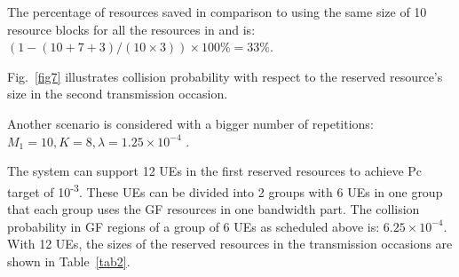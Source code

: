 \documentclass[conference]{IEEEtran}
\begin{document}

The percentage of resources saved in comparison to using the same size of 10 resource blocks for all the resources in \cite{b5} and \cite{b7} is: $(1 - (10+7+3)/(10\times3))\times100\% = 33\%$.

Fig.~\ref{fig7} illustrates collision probability with respect to the reserved resource's size in the second transmission occasion.

Another scenario is considered with a bigger number of repetitions: $M_1=10, K=8, \lambda=1.25\times10^{-4}$ .

The system can support 12 UEs in the first reserved resources to achieve Pc target of 10\textsuperscript{-3}. These UEs can be divided into 2 groups with 6 UEs in one group that each group uses the GF resources in one bandwidth part. The collision probability in GF regions of a group of 6 UEs as scheduled above is: $6.25\times10^{-4}$.
With 12 UEs, the sizes of the reserved resources in the transmission occasions are shown in Table~\ref{tab2}.
\end{document}
